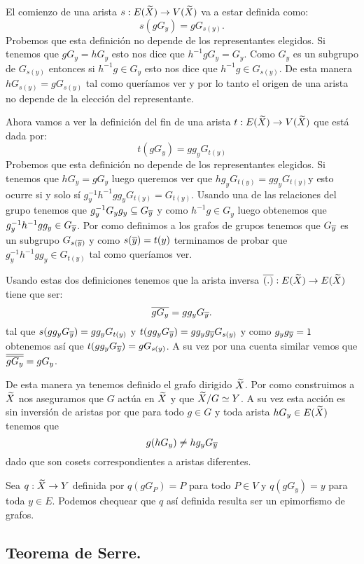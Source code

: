 \documentclass[tesis.tex]{subfiles}
\begin{document}
El comienzo de una arista $s:E(\widetilde X) \to V(\widetilde X)$ va a estar definida como:
\[
s(gG_{y}) = gG_{s(y)}.
\]
Probemos que esta definición no depende de los representantes elegidos.
Si tenemos que $gG_{y} = hG_{y}$ esto nos dice que $h^{-1}gG_{y} = G_{y}$.
Como $G_{y}$ es un subgrupo de $G_{s(y)}$ entonces si $h^{-1}g \in G_y$ esto nos dice que $h^{-1}g \in G_{s(y)}$.
De esta manera $hG_{s(y)} = gG_{s(y)}$ tal como queríamos ver y por lo tanto el origen de una arista no depende de la elección del representante.


Ahora vamos a ver la definición del fin de una arista $t:E(\widetilde X) \to V(\widetilde X)$ que está dada por:
\[
t(gG_{y}) = gg_{y}G_{t(y)}
\]
Probemos que esta definición no depende de los representantes elegidos.
Si tenemos que $hG_{y} = gG_{y}$ luego queremos ver que $hg_{y}G_{t(y)} = gg_{y}G_{t(y)}$y esto ocurre si y solo sí $g^{-1}_y h^{-1}g g_{y} G_{t(y)} = G_{t(y)}$.
Usando una de las relaciones del grupo tenemos que $g_{y}^{-1} G_{y} g_{y} \subseteq G_{\overline y}$ y como $h^{-1}g \in G_{y}$ luego obtenemos que $g^{-1}_y h^{-1}g g_{y} \in G_{\overline y}$.
Por como definimos a los grafos de grupos tenemos que $G_{\overline y}$ es un subgrupo $G_{s(\overline y)}$ y como $s(\overline y) = t(y)$ terminamos de probar que $g^{-1}_y h^{-1}g g_{y} \in G_{t(y)}$ tal como queríamos ver.


Usando estas dos definiciones tenemos que la arista inversa $\overline{(.)}:E(\widetilde X) \to E(\widetilde X)$ tiene que ser:
\[
\overline{gG_{y}} = gg_{y} G_{\overline y}.
\]
tal que $s(gg_{y}G_{\overline y}) = gg_{y}G_{t(y)}$ y $t(gg_{y}G_{\overline y}) = gg_{y}g_{\overline y}G_{s(y)}$ y como $g_{y}g_{\overline y} = 1$ obtenemos así que $t(gg_{y}G_{\overline y}) = gG_{s(y)}$.
A su vez por una cuenta similar vemos que $\overline{\overline{gG_{y}}} = gG_{y}$.

De esta manera ya tenemos definido el grafo dirigido $\widetilde X$.
Por como construimos a $\widetilde X$ nos aseguramos que $G$ actúa en $\widetilde X$ y que $\widetilde X / G \simeq Y$.
A su vez esta acción es sin inversión de aristas por que para todo $g \in G$ y toda arista $hG_{y} \in E(\widetilde X)$ tenemos que
\[
	g (hG_{y}) \neq hg_{y}G_{\overline{y}}
\]
dado que son cosets correspondientes a aristas diferentes.

Sea $q:\widetilde X \to Y$ definida por $q(gG_{P}) = P$ para todo $P \in V$ y $q(gG_{y}) = y$ para toda $y \in E$.
Podemos chequear que $q$ así definida resulta ser un epimorfismo de grafos.

\subsection{Teorema de Serre.}
\end{document}

